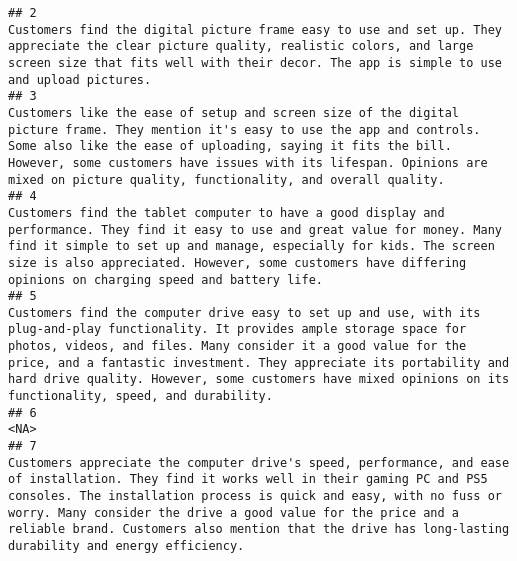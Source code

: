 \documentclass[
]{article}
\begin{document}
\begin{verbatim}
## 2                                                                                                                                                                                                                                                      Customers find the digital picture frame easy to use and set up. They appreciate the clear picture quality, realistic colors, and large screen size that fits well with their decor. The app is simple to use and upload pictures.
## 3                                                                                                                                                     Customers like the ease of setup and screen size of the digital picture frame. They mention it's easy to use the app and controls. Some also like the ease of uploading, saying it fits the bill. However, some customers have issues with its lifespan. Opinions are mixed on picture quality, functionality, and overall quality.
## 4                                                                                                                                                                  Customers find the tablet computer to have a good display and performance. They find it easy to use and great value for money. Many find it simple to set up and manage, especially for kids. The screen size is also appreciated. However, some customers have differing opinions on charging speed and battery life.
## 5                                                                                                Customers find the computer drive easy to set up and use, with its plug-and-play functionality. It provides ample storage space for photos, videos, and files. Many consider it a good value for the price, and a fantastic investment. They appreciate its portability and hard drive quality. However, some customers have mixed opinions on its functionality, speed, and durability.
## 6                                                                                                                                                                                                                                                                                                                                                                                                                                                                                    <NA>
## 7                                                                                               Customers appreciate the computer drive's speed, performance, and ease of installation. They find it works well in their gaming PC and PS5 consoles. The installation process is quick and easy, with no fuss or worry. Many consider the drive a good value for the price and a reliable brand. Customers also mention that the drive has long-lasting durability and energy efficiency.

\end{verbatim}
\end{document}
